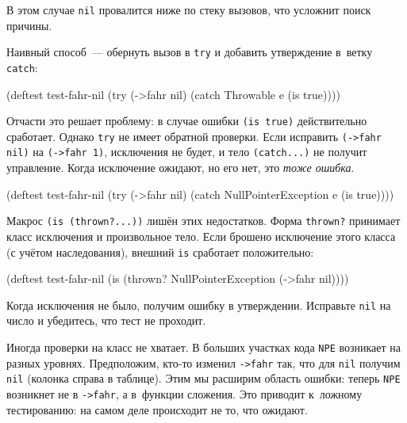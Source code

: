 
\noindent
В этом случае \verb|nil| провалится ниже по стеку вызовов, что усложнит поиск
причины.

Наивный способ~--- обернуть вызов в \verb|try| и добавить утверждение в~ветку
\verb|catch|:

\begin{english}
  \begin{clojure}
(deftest test-fahr-nil
  (try
    (->fahr nil)
    (catch Throwable e
      (is true))))
  \end{clojure}
\end{english}

Отчасти это решает проблему: в случае ошибки \verb|(is true)| действительно
сработает. Однако \verb|try| не имеет обратной проверки. Если исправить
\verb|(->fahr nil)| на \verb|(->fahr 1)|, исключения не будет, и тело
\verb|(catch...)| не получит управление. Когда исключение ожидают, но его нет,
это \emph{тоже ошибка}.


\begin{english}
  \begin{clojure}
(deftest test-fahr-nil
  (try
    (->fahr nil)
    (catch NullPointerException e
      (is true))))
  \end{clojure}
\end{english}

Макрос \verb|(is (thrown?...))| лишён этих недостатков. Форма \verb|thrown?|
принимает класс исключения и произвольное тело. Если брошено исключение этого
класса (с учётом наследования), внешний \verb|is| сработает положительно:

\begin{english}
  \begin{clojure}
(deftest test-fahr-nil
  (is (thrown? NullPointerException
               (->fahr nil))))
  \end{clojure}
\end{english}

Когда исключения не было, получим ошибку в утверждении. Исправьте \verb|nil|
на число и убедитесь, что тест не проходит.


Иногда проверки на класс не хватает. В больших участках кода \verb|NPE|
возникает на разных уровнях. Предположим, кто-то изменил \verb|->fahr| так, что
для \verb|nil| получим \verb|nil| (колонка справа в таблице). Этим мы расширим
область ошибки: теперь \verb|NPE| возникнет не в \verb|->fahr|, а в~функции
сложения. Это приводит к~ложному тестированию: на самом деле происходит не то,
что ожидают.

